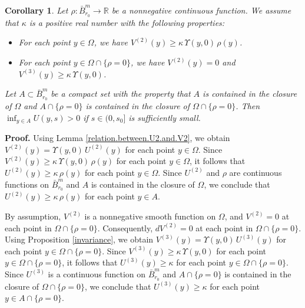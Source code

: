 \documentclass[11pt]{amsart}
\newtheorem{corollary}[theorem]{Corollary}
\theoremstyle{definition}
\begin{document}
\begin{corollary} 
\label{positivity}
Let $\rho: \bar{B}_{r_0}^m \to \mathbb{R}$ be a nonnegative continuous function. We assume that $\kappa$ is a positive real number with the following properties: 
\begin{itemize} 
\item For each point $y \in \Omega$, we have $V^{(2)}(y) \geq \kappa \, \Upsilon(y,0) \, \rho(y)$. 
\item For each point $y \in \Omega \cap \{\rho = 0\}$, we have $V^{(2)}(y) = 0$ and $V^{(3)}(y) \geq \kappa \, \Upsilon(y,0)$.
\end{itemize} 
Let $A \subset \bar{B}_{r_0}^m$ be a compact set with the property that $A$ is contained in the closure of $\Omega$ and $A \cap \{\rho = 0\}$ is contained in the closure of $\Omega \cap \{\rho = 0\}$. Then $\inf_{y \in A} U(y,s) > 0$ if $s \in (0,s_0]$ is sufficiently small.
\end{corollary}

\textbf{Proof.} 
Using Lemma \ref{relation.between.U2.and.V2}, we obtain $V^{(2)}(y) = \Upsilon(y,0) \, U^{(2)}(y)$ for each point $y \in \Omega$. Since $V^{(2)}(y) \geq \kappa \, \Upsilon(y,0) \, \rho(y)$ for each point $y \in \Omega$, it follows that $U^{(2)}(y) \geq \kappa \, \rho(y)$ for each point $y \in \Omega$. Since $U^{(2)}$ and $\rho$ are continuous functions on $\bar{B}_{r_0}^m$ and $A$ is contained in the closure of $\Omega$, we conclude that $U^{(2)}(y) \geq \kappa \, \rho(y)$ for each point $y \in A$.

By assumption, $V^{(2)}$ is a nonnegative smooth function on $\Omega$, and $V^{(2)} = 0$ at each point in $\Omega \cap \{\rho = 0\}$. Consequently, $dV^{(2)} = 0$ at each point in $\Omega \cap \{\rho = 0\}$. Using Proposition \ref{invariance}, we obtain $V^{(3)}(y) = \Upsilon(y,0) \, U^{(3)}(y)$ for each point $y \in \Omega \cap \{\rho = 0\}$. Since $V^{(3)}(y) \geq \kappa \, \Upsilon(y,0)$ for each point $y \in \Omega \cap \{\rho = 0\}$, it follows that $U^{(3)}(y) \geq \kappa$ for each point $y \in \Omega \cap \{\rho = 0\}$. Since $U^{(3)}$ is a continuous function on $\bar{B}_{r_0}^m$ and $A \cap \{\rho = 0\}$ is contained in the closure of $\Omega \cap \{\rho = 0\}$, we conclude that $U^{(3)}(y) \geq \kappa$ for each point $y \in A \cap \{\rho=0\}$. 
\end{document}
